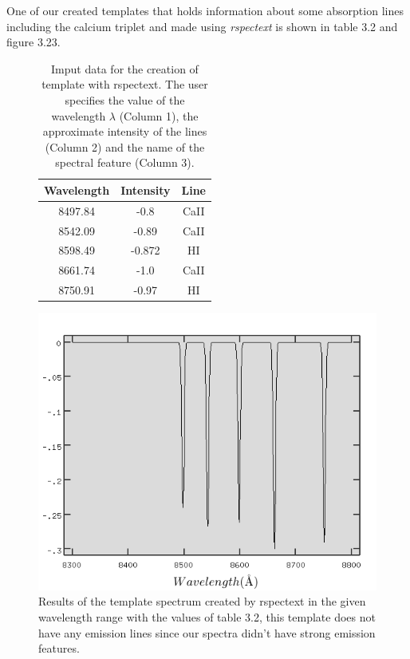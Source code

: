 One of our created templates that holds information about some absorption lines including the calcium triplet and made using \textit{rspectext} is shown in table 3.2 and figure 3.23.

\begin{figure}[H]
  \centering
  \begin{minipage}[b]{0.5\textwidth}
\begin{table}[H]
\begin{center}
  \begin{tabular}{| c|  c|  c| }
    \hline
    Wavelength & Intensity & Line \\ \hline
    8497.84 & -0.8 & CaII \\ \hline
    8542.09 & -0.89 & CaII \\ \hline 
    8598.49 & -0.872 & HI \\ \hline 
    8661.74 & -1.0 & CaII \\ \hline
    8750.91 & -0.97 & HI \\
    \hline
  \end{tabular} 
    \end{center}
\caption[Imput data for the creation of template with rspectext]{Imput data for the creation of template with rspectext. The user specifies the value of the wavelength $\lambda$ (Column 1), the approximate intensity of the lines (Column 2) and the name of the spectral feature (Column 3).}
\end{table}
  \hfill
    \end{minipage}
  \begin{minipage}[b]{0.49\textwidth}
    \includegraphics[width=\textwidth]{images/template.png}
    \caption[Results of the template spectrum created by rspectext]{Results of the template spectrum created by rspectext in the given wavelength range with the values of table 3.2, this template does not have any emission lines since our spectra didn't have strong emission features.}
  \end{minipage}
\end{figure}

